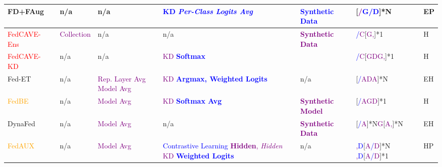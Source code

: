 \begin{table}[htp]
\begin{tabular}{|p{2.05cm}|p{1.36cm}|p{1.56cm}|p{4.35cm}|p{2.77cm}|p{1.5cm}|p{0.35cm}|}
    \rowcolor[gray]{.9}
    FD+FAug~\cite{jeong2018communication} & n/a & n/a & \textcolor{blue}{KD} \textcolor{blue}{\textit{Per-Class Logits Avg}} & \textcolor{blue}{\textbf{Synthetic Data}} & [\textcolor{purple}{/}\textcolor{blue}{G}\textcolor{blue}{/D}]*N & EP \\ \hline

    \textcolor{red}{FedCAVE-Ens}~\cite{heinbaugh2023data} & \textcolor{purple}{Collection}  & n/a & n/a & \textcolor{purple}{\textbf{Synthetic Data}} & \textcolor{blue}{/}\textcolor{purple}{C}[\textcolor{purple}{G,}]*1 & H \\
    \textcolor{red}{FedCAVE-KD}~\cite{heinbaugh2023data} & n/a & n/a & \textcolor{purple}{KD} \textcolor{blue}{\textbf{Softmax}} & & \textcolor{blue}{/}\textcolor{purple}{C}[\textcolor{purple}{GDG,}]*1 & H \\ \hline

    \rowcolor[gray]{.9}
    Fed-ET~\cite{cho2022heterogeneous} & n/a & \textcolor{purple}{Rep. Layer Avg} \newline \textcolor{purple}{Model Avg} & \textcolor{purple}{KD} \textcolor{blue}{\textbf{Argmax, Weighted Logits}} & n/a & [\textcolor{blue}{/}\textcolor{purple}{ADA}]*N & EH \\ \hline

    \textcolor{orange}{FedBE}~\cite{chen2020fedbe} & n/a & \textcolor{purple}{Model Avg} & \textcolor{purple}{KD} \textcolor{blue}{\textbf{Softmax Avg}} & \textcolor{purple}{\textbf{Synthetic Model}} & [\textcolor{blue}{/}\textcolor{purple}{AGD}]*1 & H \\ \hline %

    \rowcolor[gray]{.9}
    DynaFed~\cite{pi2023dynafed} & n/a & \textcolor{purple}{Model Avg} & n/a & \textcolor{purple}{\textbf{Synthetic Data}} & [\textcolor{blue}{/}\textcolor{purple}{A}]*N\textcolor{purple}{G}[\textcolor{purple}{A,}]*N & EH \\ \hline

    \textcolor{orange}{FedAUX}~\cite{sattler2021fedaux} & n/a & \textcolor{purple}{Model Avg} & \textcolor{blue}{Contrastive Learning} \textcolor{purple}{\textbf{Hidden}, \textit{Hidden}} \newline \textcolor{purple}{KD} \textcolor{blue}{\textbf{Weighted Logits}} & n/a & \textcolor{purple}{,}\textcolor{blue}{D}[\textcolor{purple}{A\textcolor{blue}{/}D}]*N \newline \textcolor{purple}{,}\textcolor{blue}{D}[\textcolor{purple}{A\textcolor{blue}{/}D}]*1 & HP \\ \hline %
    

\end{tabular}
\end{table}

